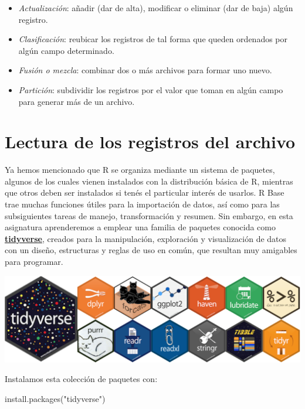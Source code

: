 \documentclass[
]{book}
\newenvironment{Shaded}{\begin{snugshade}}{\end{snugshade}}
\newcommand{\FunctionTok}[1]{\textcolor[rgb]{0.00,0.00,0.00}{#1}}
\newcommand{\NormalTok}[1]{#1}
\newcommand{\StringTok}[1]{\textcolor[rgb]{0.31,0.60,0.02}{#1}}
\providecommand{\tightlist}{%
  \setlength{\itemsep}{0pt}\setlength{\parskip}{0pt}}
\begin{document}
\begin{itemize}
  \begin{itemize}
  \tightlist
  \item
    \emph{Actualización}: añadir (dar de alta), modificar o eliminar (dar de baja) algún registro.
  \item
    \emph{Clasificación}: reubicar los registros de tal forma que queden ordenados por algún campo determinado.
  \item
    \emph{Fusión o mezcla}: combinar dos o más archivos para formar uno nuevo.
  \item
    \emph{Partición}: subdividir los registros por el valor que toman en algún campo para generar más de un archivo.
  \end{itemize}
\end{itemize}

\hypertarget{lectura-de-los-registros-del-archivo}{%
\section{Lectura de los registros del archivo}\label{lectura-de-los-registros-del-archivo}}

Ya hemos mencionado que R se organiza mediante un sistema de paquetes, algunos de los cuales vienen instalados con la distribución básica de R, mientras que otros deben ser instalados si tenés el particular interés de usarlos. R Base trae muchas funciones útiles para la importación de datos, así como para las subsiguientes tareas de manejo, transformación y resumen. Sin embargo, en esta asignatura aprenderemos a emplear una familia de paquetes conocida como \href{https://www.tidyverse.org}{\textbf{tidyverse}}, creados para la manipulación, exploración y visualización de datos con un diseño, estructuras y reglas de uso en común, que resultan muy amigables para programar.

\begin{center}\includegraphics[width=0.7\linewidth]{images/06_archivos/tidyverse} \end{center}

Instalamos esta colección de paquetes con:

\begin{Shaded}
\begin{Highlighting}[]
\FunctionTok{install.packages}\NormalTok{(}\StringTok{"tidyverse"}\NormalTok{)}
\end{Highlighting}
\end{Shaded}
\end{document}
